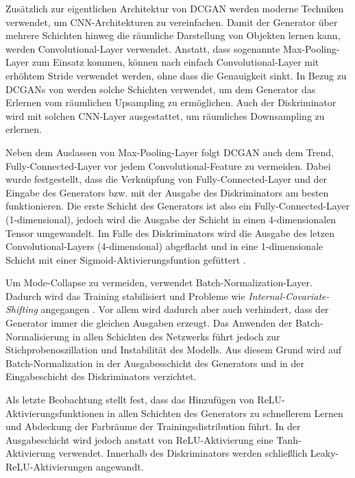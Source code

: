 \documentclass{hsflensburg}
\begin{document}
  Zusätzlich zur eigentlichen Architektur von DCGAN werden moderne Techniken
  verwendet, um CNN-Architekturen zu vereinfachen.  Damit der Generator über
  mehrere Schichten hinweg die räumliche Darstellung von Objekten lernen kann,
  werden Convolutional-Layer verwendet. Anstatt, dass sogenannte
  Max-Pooling-Layer zum Einsatz kommen, können nach
  \cite{springenberg2015striving} einfach Convolutional-Layer mit erhöhtem
  Stride verwendet werden, ohne dass die Genauigkeit sinkt. In Bezug zu DCGANs
  von \cite{radford2016unsupervised} werden solche Schichten verwendet, um dem
  Generator das Erlernen vom räumlichen Upsampling zu ermöglichen. Auch der
  Diskriminator wird mit solchen CNN-Layer ausgestattet, um räumliches
  Downsampling zu erlernen.

  Neben dem Auslassen von Max-Pooling-Layer folgt DCGAN auch dem Trend,
  Fully-Connected-Layer vor jedem Convolutional-Feature zu vermeiden. Dabei
  wurde festgestellt, dass die Verknüpfung von Fully-Connected-Layer und der
  Eingabe des Generators bzw. mit der Ausgabe des Diskriminators am besten
  funktionieren. Die erste Schicht des Generators ist also ein
  Fully-Connected-Layer (1-dimensional), jedoch wird die Ausgabe der Schicht in
  einen 4-dimensionalen Tensor umgewandelt. Im Falle des Diskriminators wird die
  Ausgabe des letzen Convolutional-Layers (4-dimensional) abgeflacht und in eine
  1-dimensionale Schicht mit einer Sigmoid-Aktivierungsfuntion gefüttert
  \cite{radford2016unsupervised}.

  Um Mode-Collapse zu vermeiden, verwendet \cite{radford2016unsupervised}
  Batch-Normalization-Layer. Dadurch wird das Training stabilisiert und Probleme
  wie \textit{Internal-Covariate-Shifting} angegangen \cite{pmlr-v37-ioffe15}.
  Vor allem wird dadurch aber auch verhindert, dass der Generator immer die
  gleichen Ausgaben erzeugt. Das Anwenden der Batch-Normalisierung in allen
  Schichten des Netzwerks führt jedoch zur Stichprobenoszillation und
  Instabilität des Modells. Aus diesem Grund wird auf Batch-Normalization in der
  Ausgabesschicht des Generators und in der Eingabeschicht des Diskriminators
  verzichtet.

  Als letzte Beobachtung stellt \cite{radford2016unsupervised} fest, dass das
  Hinzufügen von ReLU-Ak\-ti\-vier\-ungs\-funk\-tio\-nen in allen Schichten des
  Generators zu schnellerem Lernen und Abdeckung der Farbräume der
  Trainingsdistribution führt. In der Ausgabeschicht wird jedoch anstatt von
  ReLU-Aktivierung eine Tanh-Aktivierung verwendet. Innerhalb des Diskriminators
  werden schließlich Leaky-ReLU-Aktivierungen angewandt.
\end{document}
